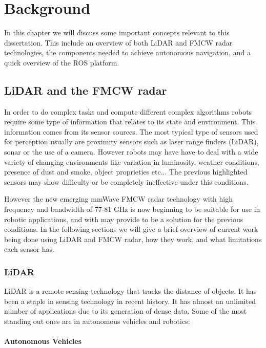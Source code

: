 \chapter{Background} \label{ch:Concepts}

In this chapter we will discuss some important concepts relevant to this dissertation. This include an overview of both \ac{LiDAR} and \ac{FMCW} radar technologies, the components needed to achieve autonomous navigation,  and a quick overview of the \ac{ROS} platform.

\section{LiDAR and the FMCW radar}
In order to do complex tasks and compute different complex algorithms robots require some type of information that relates to its state and environment. This information comes from its sensor sources.
The most typical type of sensors used for perception usually are proximity sensors such as laser range finders (\ac{LiDAR}), sonar or the use of a camera. However robots may have have to deal with a wide variety of changing environments like variation in luminosity, weather conditions, presence of dust and smoke, object proprieties etc... The previous highlighted sensors may show difficulty or be completely ineffective under this conditions.

However the new emerging \ac{mmWave} \ac{FMCW} radar technology with high frequency and bandwidth of 77-81 GHz is now beginning to be suitable for use in robotic applications, and with may provide to be a solution for the previous conditions. In the following  sections we will give a brief overview of current work being done using \ac{LiDAR} and \ac{FMCW} \ac{radar}, how they work, and what limitations each sensor has.

\subsection{LiDAR}

\ac{LiDAR} is a remote sensing technology that tracks the distance of objects. It has been a staple in sensing technology in recent history. It has almost an  unlimited  number of applications \cite{lidar100uses} due to its generation of dense data. Some of the most standing out ones are in autonomous vehicles and robotics:
\subsubsection*{Autonomous Vehicles}

